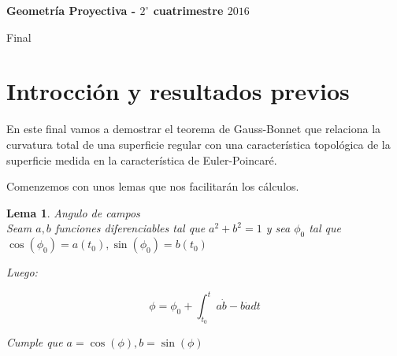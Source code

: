 \documentclass[11pt]{article}
\newtheorem{lemma}[theorem]{Lema}
\begin{document}
	
	\pagestyle{empty}
	\pagestyle{fancy}
	\fancyfoot[CO]{\slshape \thepage}
	\renewcommand{\headrulewidth}{0pt}
	
	
	
	\centerline{\bf Geometr\'ia Proyectiva - $2^{\circ}$ cuatrimestre $2016$}
	\centerline{\sc Final}
	
	\bigskip

\section{Introcci\'on y resultados previos}

En este final vamos a demostrar el teorema de Gauss-Bonnet que relaciona la curvatura total de una superficie regular con una caracter\'istica topol\'ogica de la superficie medida en la caracter\'istica de Euler-Poincar\'e.

Comenzemos con unos lemas que nos facilitar\'an los c\'alculos.

\begin{lemma}{Angulo de campos}
	\label{Existencia de funcion de angulo}
	\\
	
	Seam $a,b$ funciones diferenciables tal que $a^2 + b^2 = 1$ y sea $\phi_0$ tal que $\cos(\phi_0)=a(t_0), \sin(\phi_0)=b(t_0)$
	
	Luego:
	
	\begin{equation*}
		\phi = \phi_0 + \int_{t_0}^{t}{a\dot{b} - b\dot{a} dt}
	\end{equation*}
	
	Cumple que $a = \cos(\phi), b = \sin(\phi)$
	
\end{lemma}
\end{document}
